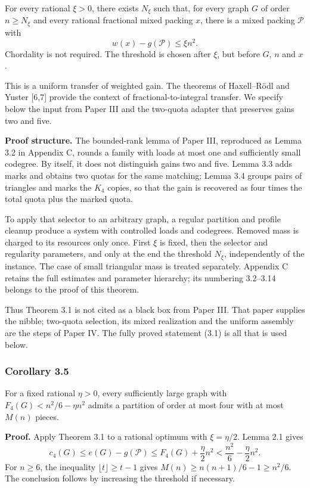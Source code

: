 \documentclass[english,11pt,a4paper]{article}
\begin{document}
For every rational \(\xi>0\), there exists \(N_\xi\) such that, for every graph \(G\) of order \(n\ge N_\xi\) and every rational fractional mixed packing \(x\), there is a mixed packing \(\mathcal P\) with \[
w(x)-g(\mathcal P)\le\xi n^2.
\tag{3.1}
\] Chordality is not required. The threshold is chosen after \(\xi\), but before \(G\), \(n\) and \(x\).

This is a uniform transfer of weighted gain. The theorems of Haxell--Rödl and Yuster {[}6,7{]} provide the context of fractional-to-integral transfer. We specify below the input from Paper III and the two-quota adapter that preserves gains two and five.

\textbf{Proof structure.} The bounded-rank lemma of Paper III, reproduced as Lemma 3.2 in Appendix C, rounds a family with loads at most one and sufficiently small codegree. By itself, it does not distinguish gains two and five. Lemma 3.3 adds marks and obtains two quotas for the same matching; Lemma 3.4 groups pairs of triangles and marks the \(K_4\) copies, so that the gain is recovered as four times the total quota plus the marked quota.

To apply that selector to an arbitrary graph, a regular partition and profile cleanup produce a system with controlled loads and codegrees. Removed mass is charged to its resources only once. First \(\xi\) is fixed, then the selector and regularity parameters, and only at the end the threshold \(N_\xi\), independently of the instance. The case of small triangular mass is treated separately. Appendix C retains the full estimates and parameter hierarchy; its numbering 3.2--3.14 belongs to the proof of this theorem.

Thus Theorem 3.1 is not cited as a black box from Paper III. That paper supplies the nibble; two-quota selection, its mixed realization and the uniform assembly are the steps of Paper IV. The fully proved statement (3.1) is all that is used below.

\subsubsection{Corollary 3.5}\label{corollary-3.5}

For a fixed rational \(\eta>0\), every sufficiently large graph with \(F_4(G)<n^2/6-\eta n^2\) admits a partition of order at most four with at most \(M(n)\) pieces.

\textbf{Proof.} Apply Theorem 3.1 to a rational optimum with \(\xi=\eta/2\). Lemma 2.1 gives \[
c_4(G)\le e(G)-g(\mathcal P)
\le F_4(G)+\frac\eta2n^2
<\frac{n^2}{6}-\frac\eta2n^2.
\] For \(n\ge6\), the inequality \(\lfloor t\rfloor\ge t-1\) gives \(M(n)\ge n(n+1)/6-1\ge n^2/6\). The conclusion follows by increasing the threshold if necessary.
\end{document}
